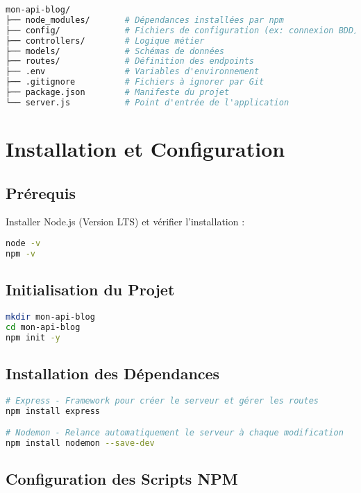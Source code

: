 \documentclass[12pt,a4paper]{article}
\begin{document}
\begin{lstlisting}[language=bash, caption=Structure des dossiers]
mon-api-blog/
├── node_modules/       # Dépendances installées par npm
├── config/             # Fichiers de configuration (ex: connexion BDD)
├── controllers/        # Logique métier
├── models/             # Schémas de données
├── routes/             # Définition des endpoints
├── .env                # Variables d'environnement
├── .gitignore          # Fichiers à ignorer par Git
├── package.json        # Manifeste du projet
└── server.js           # Point d'entrée de l'application
\end{lstlisting}

\section{Installation et Configuration}

\subsection{Prérequis}

Installer Node.js (Version LTS) et vérifier l'installation :

\begin{lstlisting}[language=bash]
node -v
npm -v
\end{lstlisting}

\subsection{Initialisation du Projet}

\begin{lstlisting}[language=bash]
mkdir mon-api-blog
cd mon-api-blog
npm init -y
\end{lstlisting}

\subsection{Installation des Dépendances}

\begin{lstlisting}[language=bash]
# Express - Framework pour créer le serveur et gérer les routes
npm install express

# Nodemon - Relance automatiquement le serveur à chaque modification
npm install nodemon --save-dev
\end{lstlisting}

\subsection{Configuration des Scripts NPM}
\end{document}
